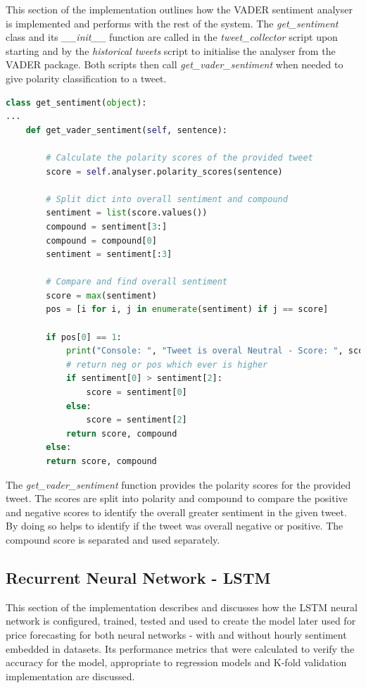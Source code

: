 \documentclass[oneside, 12pt]{article}
\begin{document}
		This section of the implementation outlines how the VADER sentiment analyser is implemented and performs with the rest of the system. The \textit{get\_sentiment} class and its \textit{\_\_init\_\_} function are called in the \textit{tweet\_collector} script upon starting and by the \textit{historical tweets} script to initialise the analyser from the VADER package. Both scripts then call \textit{get\_vader\_sentiment} when needed to give polarity classification to a tweet.
		
		\begin{lstlisting}[language=python, caption=VADER polarity classification]
class get_sentiment(object):
...
	def get_vader_sentiment(self, sentence):
	
		# Calculate the polarity scores of the provided tweet
		score = self.analyser.polarity_scores(sentence)
		
		# Split dict into overall sentiment and compound
		sentiment = list(score.values())
		compound = sentiment[3:]
		compound = compound[0]
		sentiment = sentiment[:3]
		
		# Compare and find overall sentiment
		score = max(sentiment)
		pos = [i for i, j in enumerate(sentiment) if j == score]
		
		if pos[0] == 1:
			print("Console: ", "Tweet is overal Neutral - Score: ", score)
			# return neg or pos which ever is higher
			if sentiment[0] > sentiment[2]:
				score = sentiment[0]
			else:
				score = sentiment[2]
			return score, compound
		else:
		return score, compound
		\end{lstlisting}
		
		The \textit{get\_vader\_sentiment} function provides the polarity scores for the provided tweet. The scores are split into polarity and compound to compare the positive and negative scores to identify the overall greater sentiment in the given tweet. By doing so helps to identify if the tweet was overall negative or positive. The compound score is separated and used separately.
			
		\subsection{Recurrent Neural Network - LSTM}
		This section of the implementation describes and discusses how the LSTM neural network is configured, trained, tested and used to create the model later used for price forecasting for both neural networks - with and without hourly sentiment embedded in datasets. Its performance metrics that were calculated to verify the accuracy for the model, appropriate to regression models and K-fold validation implementation are discussed.	
		
\end{document}

